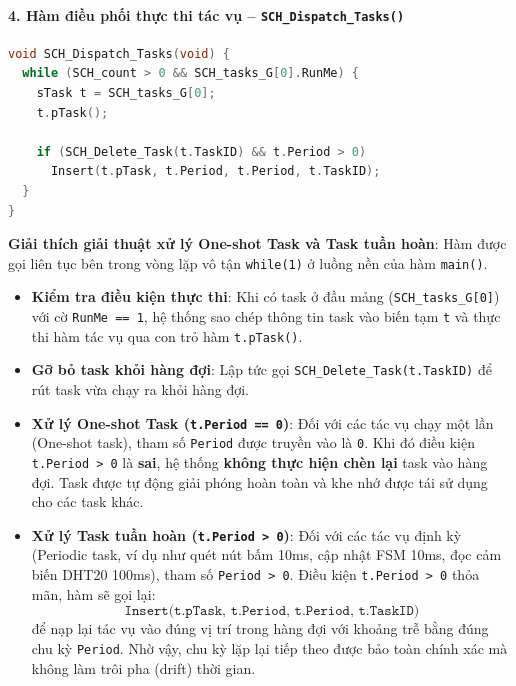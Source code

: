 \paragraph{4. Hàm điều phối thực thi tác vụ -- \texttt{SCH\_Dispatch\_Tasks()}}
\begin{lstlisting}[language=C, caption={Mã nguồn hàm SCH\_Dispatch\_Tasks}]
void SCH_Dispatch_Tasks(void) {
  while (SCH_count > 0 && SCH_tasks_G[0].RunMe) {
    sTask t = SCH_tasks_G[0];
    t.pTask();

    if (SCH_Delete_Task(t.TaskID) && t.Period > 0)
      Insert(t.pTask, t.Period, t.Period, t.TaskID);
  }
}
\end{lstlisting}
\textbf{Giải thích giải thuật xử lý One-shot Task và Task tuần hoàn}:
Hàm được gọi liên tục bên trong vòng lặp vô tận \texttt{while(1)} ở luồng nền của hàm \texttt{main()}.
\begin{itemize}
    \item \textbf{Kiểm tra điều kiện thực thi}: Khi có task ở đầu mảng (\texttt{SCH\_tasks\_G[0]}) với cờ \texttt{RunMe == 1}, hệ thống sao chép thông tin task vào biến tạm \texttt{t} và thực thi hàm tác vụ qua con trỏ hàm \texttt{t.pTask()}.
    \item \textbf{Gỡ bỏ task khỏi hàng đợi}: Lập tức gọi \texttt{SCH\_Delete\_Task(t.TaskID)} để rút task vừa chạy ra khỏi hàng đợi.
    \item \textbf{Xử lý One-shot Task (\texttt{t.Period == 0})}:
    Đối với các tác vụ chạy một lần (One-shot task), tham số \texttt{Period} được truyền vào là \texttt{0}. Khi đó điều kiện \texttt{t.Period > 0} là \textbf{sai}, hệ thống \textbf{không thực hiện chèn lại} task vào hàng đợi. Task được tự động giải phóng hoàn toàn và khe nhớ được tái sử dụng cho các task khác.
    \item \textbf{Xử lý Task tuần hoàn (\texttt{t.Period > 0})}:
    Đối với các tác vụ định kỳ (Periodic task, ví dụ như quét nút bấm 10ms, cập nhật FSM 10ms, đọc cảm biến DHT20 100ms), tham số \texttt{Period > 0}. Điều kiện \texttt{t.Period > 0} thỏa mãn, hàm sẽ gọi lại:
    \begin{equation*}
        \texttt{Insert(t.pTask, t.Period, t.Period, t.TaskID)}
    \end{equation*}
    để nạp lại tác vụ vào đúng vị trí trong hàng đợi với khoảng trễ bằng đúng chu kỳ \texttt{Period}. Nhờ vậy, chu kỳ lặp lại tiếp theo được bảo toàn chính xác mà không làm trôi pha (drift) thời gian.
\end{itemize}

